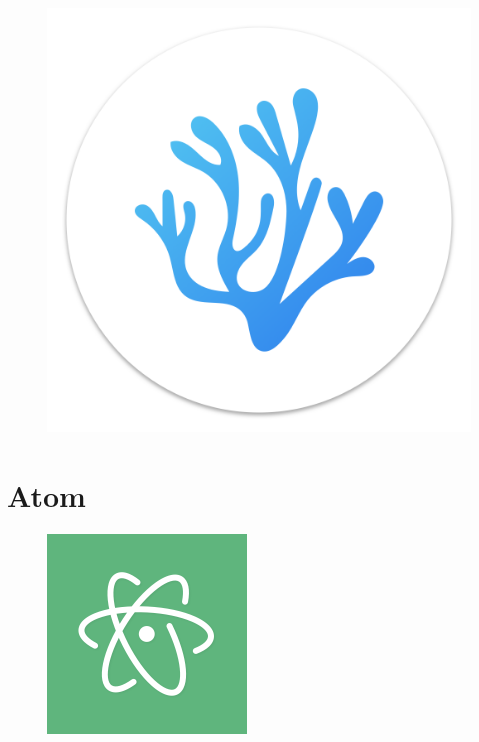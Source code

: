 \lipsum[1]
\begin{figure}
\includegraphics[width=0.19\paperwidth]{./img/editors/vscodium}
\end{figure}
\lipsum[1]

\section{Atom}

\lipsum[1]
\begin{figure}
	\includegraphics[width=0.19\paperwidth]{./img/editors/atom}
\end{figure}
\lipsum[1]